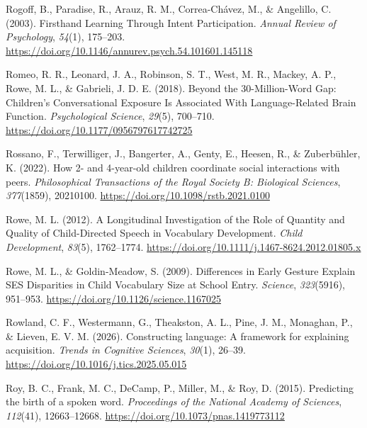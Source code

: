 \documentclass[
  english,
  12pt,
  man,floatsintext]{apa6}
\newlength{\cslhangindent}
\newenvironment{CSLReferences}[2] %
 {\begin{list}{}{%
  \setlength{\itemindent}{0pt}
  \setlength{\leftmargin}{0pt}
  \setlength{\parsep}{0pt}
  \ifodd #1
   \setlength{\leftmargin}{\cslhangindent}
   \setlength{\itemindent}{-1\cslhangindent}
  \fi
  \setlength{\itemsep}{#2\baselineskip}}}
 {\end{list}}
\begin{document}
\begin{CSLReferences}{1}{0}
Rogoff, B., Paradise, R., Arauz, R. M., Correa-Chávez, M., \& Angelillo, C. (2003). Firsthand {Learning Through Intent Participation}. \emph{Annual Review of Psychology}, \emph{54}(1), 175--203. \url{https://doi.org/10.1146/annurev.psych.54.101601.145118}

Romeo, R. R., Leonard, J. A., Robinson, S. T., West, M. R., Mackey, A. P., Rowe, M. L., \& Gabrieli, J. D. E. (2018). Beyond the 30-{Million-Word Gap}: {Children}'s {Conversational Exposure Is Associated With Language-Related Brain Function}. \emph{Psychological Science}, \emph{29}(5), 700--710. \url{https://doi.org/10.1177/0956797617742725}

Rossano, F., Terwilliger, J., Bangerter, A., Genty, E., Heesen, R., \& Zuberbühler, K. (2022). How 2- and 4-year-old children coordinate social interactions with peers. \emph{Philosophical Transactions of the Royal Society B: Biological Sciences}, \emph{377}(1859), 20210100. \url{https://doi.org/10.1098/rstb.2021.0100}

Rowe, M. L. (2012). A {Longitudinal Investigation} of the {Role} of {Quantity} and {Quality} of {Child-Directed Speech} in {Vocabulary Development}. \emph{Child Development}, \emph{83}(5), 1762--1774. \url{https://doi.org/10.1111/j.1467-8624.2012.01805.x}

Rowe, M. L., \& Goldin-Meadow, S. (2009). Differences in {Early Gesture Explain SES Disparities} in {Child Vocabulary Size} at {School Entry}. \emph{Science}, \emph{323}(5916), 951--953. \url{https://doi.org/10.1126/science.1167025}

Rowland, C. F., Westermann, G., Theakston, A. L., Pine, J. M., Monaghan, P., \& Lieven, E. V. M. (2026). Constructing language: A framework for explaining acquisition. \emph{Trends in Cognitive Sciences}, \emph{30}(1), 26--39. \url{https://doi.org/10.1016/j.tics.2025.05.015}

Roy, B. C., Frank, M. C., DeCamp, P., Miller, M., \& Roy, D. (2015). Predicting the birth of a spoken word. \emph{Proceedings of the National Academy of Sciences}, \emph{112}(41), 12663--12668. \url{https://doi.org/10.1073/pnas.1419773112}


\end{CSLReferences}
\end{document}
